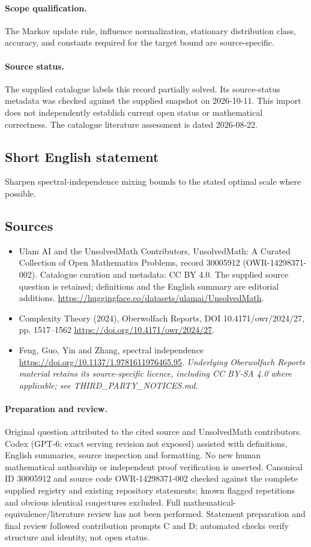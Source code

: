 \documentclass[11pt]{article}
\begin{document}
\paragraph{Scope qualification.}
The Markov update rule, influence normalization, stationary distribution class, accuracy, and constants required for the target bound are source-specific.
\paragraph{Source status.}
The supplied catalogue labels this record partially solved. Its source-status metadata was checked against the supplied snapshot on 2026-10-11. This import does not independently establish current open status or mathematical correctness. The catalogue literature assessment is dated 2026-08-22.
\subsection{Short English statement}
Sharpen spectral-independence mixing bounds to the stated optimal scale where possible.
\subsection{Sources}
\begin{itemize}
\item[S1] Ulam AI and the UnsolvedMath Contributors, UnsolvedMath: A Curated Collection of Open Mathematics Problems, record 30005912 (OWR-14298371-002). Catalogue curation and metadata: CC BY 4.0. The supplied source question is retained; definitions and the English summary are editorial additions.
\url{https://huggingface.co/datasets/ulamai/UnsolvedMath}.
\item[S2] Complexity Theory (2024), Oberwolfach Reports, DOI 10.4171/owr/2024/27, pp. 1517--1562
\url{https://doi.org/10.4171/owr/2024/27}.
\item[S3] Feng, Guo, Yin and Zhang, spectral independence
\url{https://doi.org/10.1137/1.9781611976465.95}.
\textit{Underlying Oberwolfach Reports material retains its source-specific licence, including CC BY-SA 4.0 where applicable; see THIRD\_PARTY\_NOTICES.md.}
\end{itemize}
\paragraph{Preparation and review.}
Original question attributed to the cited source and UnsolvedMath contributors. Codex (GPT-6; exact serving revision not exposed) assisted with definitions, English summaries, source inspection and formatting. No new human mathematical authorship or independent proof verification is asserted. Canonical ID 30005912 and source code OWR-14298371-002 checked against the complete supplied registry and existing repository statements; known flagged repetitions and obvious identical conjectures excluded. Full mathematical-equivalence/literature review has not been performed. Statement preparation and final review followed contribution prompts C and D; automated checks verify structure and identity, not open status.
\label{end:30005912}
\end{document}
